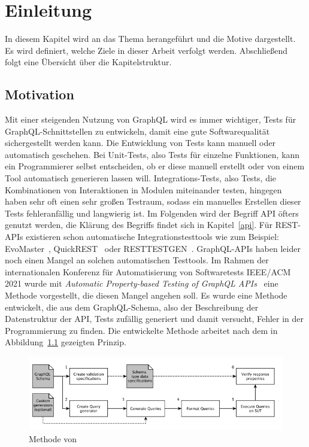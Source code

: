 \chapter{Einleitung}

In diesem Kapitel wird an das Thema herangeführt und die Motive dargestellt.
Es wird definiert, welche Ziele in dieser Arbeit verfolgt werden.
Abschließend folgt eine Übersicht über die Kapitelstruktur.

\section{Motivation}

Mit einer steigenden Nutzung von GraphQL wird es immer wichtiger, Tests für GraphQL-Schnittstellen zu entwickeln, damit eine gute Softwarequalität sichergestellt werden kann.
Die Entwicklung von Tests kann manuell oder automatisch geschehen.
Bei Unit-Tests, also Tests für einzelne Funktionen, kann ein Programmierer selbst entscheiden, ob er diese manuell erstellt
oder von einem Tool automatisch generieren lassen will.
Integrations-Tests, also Tests, die Kombinationen von Interaktionen in Modulen miteinander testen, hingegen haben sehr oft
einen sehr großen Testraum, sodass ein manuelles Erstellen dieser Tests fehleranfällig und langwierig ist.
Im Folgenden wird der Begriff API öfters genutzt werden, die Klärung des Begriffs findet sich in Kapitel~\ref{api}.
Für REST-APIs existieren schon automatische Integrationstesttools wie zum Beispiel: EvoMaster~\cite{evo-master}, QuickREST~\cite{karlsson2019quickrest} oder RESTTESTGEN~\cite{rest-test-gen}.
GraphQL-APIs haben leider noch einen Mangel an solchen automatischen Testtools.
Im Rahmen der internationalen  Konferenz für Automatisierung  von  Softwaretests IEEE/ACM 2021 wurde mit
\textit{Automatic Property-based Testing of GraphQL APIs}~\cite{property-based-testing} eine Methode vorgestellt, die diesen Mangel angehen soll.
Es wurde eine Methode entwickelt, die aus dem GraphQL-Schema, also der Beschreibung der Datenstruktur der API, Tests zufällig generiert und damit versucht, Fehler in der Programmierung zu finden.
Die entwickelte Methode arbeitet nach dem in Abbildung~\ref{property-based-method} gezeigten Prinzip.

\begin{figure}[h!]
    \centering
    \includegraphics[width=\textwidth,height=\textheight,keepaspectratio]{content/einleitung/toolchain}
    \caption{Methode von~\cite{property-based-testing}}
    \label{property-based-method}
\end{figure}
\newpage

